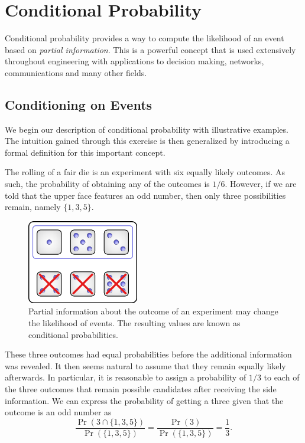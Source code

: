 \chapter{Conditional Probability}
\label{chapter:ConditionalProbability}

Conditional probability provides a way to compute the likelihood of an event based on \emph{partial information}.
This is a powerful concept that is used extensively throughout engineering with applications to decision making, networks, communications and many other fields.


\section{Conditioning on Events}

We begin our description of conditional probability with illustrative examples.
The intuition gained through this exercise is then generalized by introducing a formal definition for this important concept.

\begin{example}
The rolling of a fair die is an experiment with six equally likely outcomes.
As such, the probability of obtaining any of the outcomes is $1/6$.
However, if we are told that the upper face features an odd number, then only three possibilities remain, namely $\{1, 3, 5 \}$.
\begin{figure}[htb!]
\begin{center}
\begin{psfrags}
\includegraphics[height=3.675cm]{Figures/3Chapter/condevent}
\end{psfrags}
\caption{Partial information about the outcome of an experiment may change the likelihood of events.
The resulting values are known as conditional probabilities.}
\label{figure:CondEvent}
\end{center}
\end{figure}
These three outcomes had equal probabilities before the additional information was revealed.
It then seems natural to assume that they remain equally likely afterwards.
In particular, it is reasonable to assign a probability of $1/3$ to each of the three outcomes that remain possible candidates after receiving the side information.
We can express the probability of getting a three given that the outcome is an odd number as
\begin{equation*}
\frac{\Pr (3 \cap \{ 1, 3, 5 \})}{\Pr (\{ 1, 3, 5 \} ) }
= \frac{\Pr(3)}{\Pr (\{1,3,5\})} = \frac{1}{3} .
\end{equation*}
\end{example}


